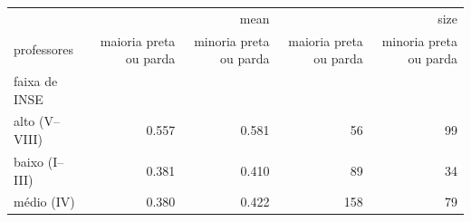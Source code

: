 \begin{tabular}{lrrrr}
\toprule
 & \multicolumn{2}{r}{mean} & \multicolumn{2}{r}{size} \\
professores & maioria preta ou parda & minoria preta ou parda & maioria preta ou parda & minoria preta ou parda \\
faixa de INSE &  &  &  &  \\
\midrule
alto (V–VIII) & 0.557 & 0.581 & 56 & 99 \\
baixo (I–III) & 0.381 & 0.410 & 89 & 34 \\
médio (IV) & 0.380 & 0.422 & 158 & 79 \\
\bottomrule
\end{tabular}

